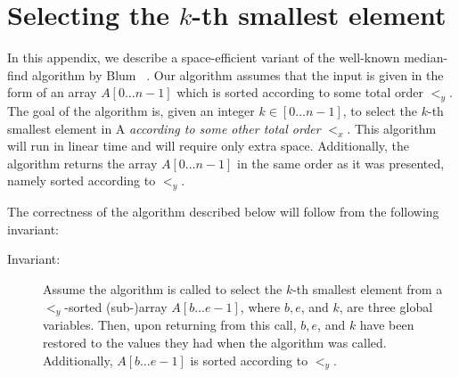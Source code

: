 
\newcommand{\LA}{\ensuremath{<_{y}}}
\newcommand{\LB}{\ensuremath{<_{x}}}

\section{Selecting the $k$-th smallest element} \label{sec:detkmed}

In this appendix, we describe a space-efficient variant of the
well-known median-find algorithm by Blum \etal~\cite{blum:selection}.
Our algorithm assumes that the input is given in the form of an array
${A}[0\ldots n-1]$ which is sorted according to some total
order \LA. The goal of the algorithm is, given an integer $k\in
[0\ldots n-1]$, to select the $k$-th smallest element in {A}
\emph{according to some other total order} \LB. This algorithm will
run in linear time and will require only  extra space. 
Additionally, the algorithm returns the array ${A}[0\ldots n-1]$ 
in the same order as it was presented, namely sorted according to \LA.

The correctness of the algorithm described below will follow from the
following invariant:

\begin{description}
\item[Invariant:] Assume the algorithm is called to select the $k$-th
  smallest element from a \LA-sorted (sub-)array
  ${A}[b\ldots e-1]$, where $b,e$, and $k$, are three global
  variables. Then, upon returning from this call, $b,e$, and $k$ 
  have been restored to the values they had when the algorithm was 
  called. Additionally, ${A}[b\ldots e-1]$ is sorted according 
  to \LA. 
\end{description}



